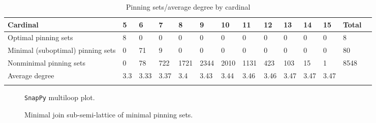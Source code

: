 \documentclass{article}%
\begin{document}
\begin{table}[ht]
	\caption{Pinning sets/average degree by cardinal}
	\centering
	\renewcommand{\arraystretch}{1.5}
	\begin{tabularx}{\textwidth}{lXXXXXXXXXXXXX}
		\toprule
			Cardinal & 5 & 6 & 7 & 8 & 9 & 10 & 11 & 12 & 13 & 14 & 15 & Total\\
			\hline
			Optimal pinning sets & 8 & 0 & 0 & 0 & 0 & 0 & 0 & 0 & 0 & 0 & 0 & 8 \\
			Minimal (suboptimal) pinning sets & 0 & 71 & 9 & 0 & 0 & 0 & 0 & 0 & 0 & 0 & 0 & 80 \\
			Nonminimal pinning sets & 0 & 78 & 722 & 1721 & 2344 & 2010 & 1131 & 423 & 103 & 15 & 1 & 8548 \\
			Average degree & 3.3 & 3.33 & 3.37 & 3.4 & 3.43 & 3.44 & 3.46 & 3.46 & 3.47 & 3.47 & 3.47 &  \\
		\bottomrule \\ 
	\end{tabularx}
\end{table}

\begin{multicols}{2}
\begin{figure}[H]
\centering

\caption{\texttt{SnapPy} multiloop plot.}
\label{fig:tex/img/[[6, 20, 1, 7], [7, 15, 8, 14], [5, 13, 6, 14], [19, 26, 20, 21], [1, 26, 2, 25], [15, 25, 16, 24], [8, 24, 9, 23], [4, 22, 5, 23], [12, 21, 13, 22], [18, 11, 19, 12], [2, 11, 3, 10], [16, 10, 17, 9],.svg}
\end{figure}
\columnbreak

\begin{figure}[H]
\centering
\scalebox{0.8}{}
\caption{Minimal join sub-semi-lattice of minimal pinning sets.}
\label{fig:tex/img/[[6, 20, 1, 7], [7, 15, 8, 14], [5, 13, 6, 14], [19, 26, 20, 21], [1, 26, 2, 25], [15, 25, 16, 24], [8, 24, 9, 23], [4, 22, 5, 23], [12, 21, 13, 22], [18, 11, 19, 12], [2, 11, 3, 10], [16, 10, 17, 9],.pgf}
\end{figure}
\end{multicols}
\end{document}
